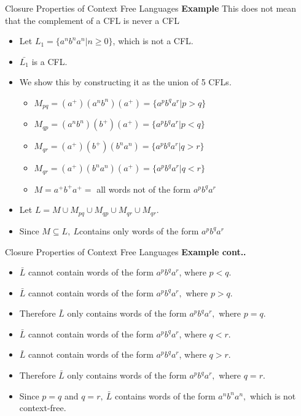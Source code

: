 \documentclass{beamer}
\begin{document}
\begin{frame}{Closure Properties of Context Free Languages}
	\textbf{Example}
		This does not mean that the complement of a CFL is never a CFL
		\begin{itemize}
			\item Let $L_1 = \{a^nb^na^n|n \geq 0\}$, which is not a CFL.
			\item $\bar{L_1}$ is a CFL.
			\item We show this by constructing it as the union of 5 CFLs.
			\begin{itemize}
				\item $M_{pq} = (a^+)(a^nb^n)(a^+) = \{a^pb^qa^r| p > q\}$
				\item $M_{qp} = (a^nb^n)(b^+)(a^+) = \{a^pb^qa^r| p < q\}$
				\item $M_{qr} = (a^+)(b^+)(b^na^n) = \{a^pb^qa^r| q > r\}$
				\item $M_{qr} = (a^+)(b^na^n)(a^+) = \{a^pb^qa^r| q < r\}$
				\item $M = a^+b^+a^+ =$ all words not of the form $a^pb^qa^r$
			\end{itemize}
		
			\item Let $L = M \cup M_{pq} \cup M_{qp} \cup M_{qr} \cup M_{qr}.$
			\item Since $M \subseteq L,\  L $contains only words of the form $a^pb^qa^r$
		\end{itemize}
\end{frame}
\begin{frame}{Closure Properties of Context Free Languages}
	\textbf{Example cont..}
\begin{itemize}
	\item $\bar{L}$ cannot contain words of the form $a^pb^qa^r$, where $p < q.$
	\item $\bar{L}$ cannot contain words of the form $a^pb^qa^r,$ where $p > q.$
	\item Therefore $\bar{L}$ only contains words of the form $a^pb^qa^r,$ where $p= q.$
	\item $\bar{L}$ cannot contain words of the form $a^pb^qa^r$, where $q < r.$
	\item $\bar{L}$ cannot contain words of the form $a^pb^qa^r$, where $q > r.$
	\item Therefore $\bar{L}$ only contains words of the form $a^pb^qa^r,$ where $q = r.$
	\item Since $p = q$ and $q = r, \ \bar{L}$ contains words of the form $a^nb^na^n,$ which	is not context-free.

\end{itemize}
\end{frame}
\end{document}
